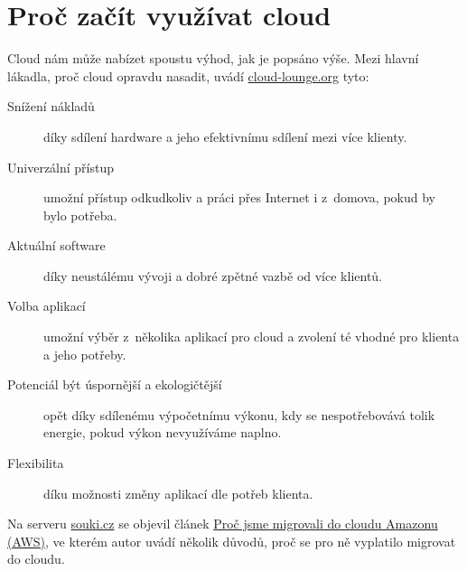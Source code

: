 \section{Proč začít využívat cloud}
Cloud nám může nabízet spoustu výhod, jak je popsáno výše. Mezi hlavní lákadla, proč cloud opravdu nasadit, uvádí \href{http://www.cloud-lounge.org/why-use-clouds.html}{cloud-lounge.org}\cite{cloudlounge:ProcCloud} tyto:
\begin{description}
	\item [Snížení nákladů] díky sdílení hardware a jeho efektivnímu sdílení mezi více klienty.
	\item [Univerzální přístup] umožní přístup odkudkoliv a práci přes Internet i z~domova, pokud by bylo potřeba.
	\item [Aktuální software] díky neustálému vývoji a dobré zpětné vazbě od více klientů.
	\item [Volba aplikací] umožní výběr z~několika aplikací pro cloud a zvolení té vhodné pro klienta a jeho potřeby.
	\item [Potenciál být úspornější a ekologičtější] opět díky sdílenému výpočetnímu výkonu, kdy se nespotřebovává tolik energie, pokud výkon nevyužíváme naplno.
	\item [Flexibilita] díku možnosti změny aplikací dle potřeb klienta.
\end{description}
Na serveru \href{http://souki.cz}{souki.cz} se objevil článek \href{http://www.souki.cz/proc-jsme-migrovali-do-cloudu-amazonu-aws}{Proč jsme migrovali do cloudu Amazonu (AWS)\cite{souki:procMigrovat}}, ve kterém autor uvádí několik důvodů, proč se pro ně vyplatilo migrovat do cloudu.
